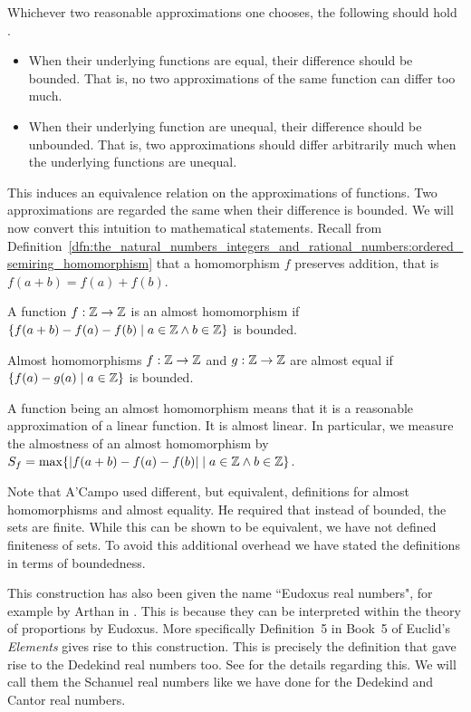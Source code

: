 \documentclass[../main.tex]{subfiles}
\begin{document}
Whichever two reasonable approximations one chooses, the following should hold \cite{Piponi2006}.
\begin{itemize}
    \item When their underlying functions are equal, their difference should be bounded. That is, no two approximations of the same function can differ too much.
    \item When their underlying function are unequal, their difference should be unbounded. That is, two approximations should differ arbitrarily much when the underlying functions are unequal.
\end{itemize}
This induces an equivalence relation on the approximations of functions. Two approximations are regarded the same when their difference is bounded. We will now convert this intuition to mathematical statements. Recall from Definition~\ref{dfn:the_natural_numbers_integers_and_rational_numbers:ordered_semiring_homomorphism} that a homomorphism $f$ preserves addition, that is $f(a+b)=f(a)+f(b)$.
\begin{definition}
    A function $f:\mathbb{Z}\to\mathbb{Z}$ is an almost homomorphism if $\{f(a+b)-f(a)-f(b)\mid a\in\mathbb{Z}\land b\in\mathbb{Z}\}$ is bounded.
\end{definition}
\begin{definition}
    Almost homomorphisms $f:\mathbb{Z}\to\mathbb{Z}$ and $g:\mathbb{Z}\to\mathbb{Z}$ are almost equal if $\{f(a)-g(a)\mid a\in\mathbb{Z}\}$ is bounded.
\end{definition}
A function being an almost homomorphism means that it is a reasonable approximation of a linear function. It is almost linear. In particular, we measure the almostness of an almost homomorphism by $S_f=\max\{\vert f(a+b)-f(a)-f(b)\vert\mid a\in\mathbb{Z}\land b\in\mathbb{Z}\}$.

Note that A'Campo used different, but equivalent, definitions for almost homomorphisms and almost equality. He required that instead of bounded, the sets are finite. While this can be shown to be equivalent, we have not defined finiteness of sets. To avoid this additional overhead we have stated the definitions in terms of boundedness.

This construction has also been given the name ``Eudoxus real numbers", for example by Arthan in \cite{Arthan2004}. This is because they can be interpreted within the theory of proportions by Eudoxus. More specifically Definition~5 in Book~5 of Euclid's \textit{Elements} gives rise to this construction. This is precisely the definition that gave rise to the Dedekind real numbers too. See \cite{Arthan2004} for the details regarding this. We will call them the Schanuel real numbers like we have done for the Dedekind and Cantor real numbers.
\end{document}
